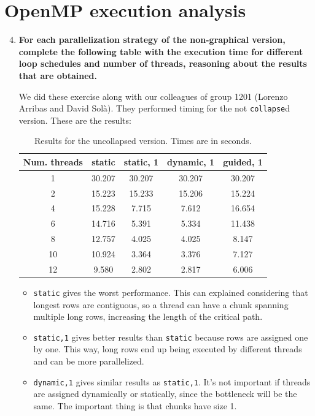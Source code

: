 \documentclass[a4paper,11pt]{article}
\newcommand{\answerspace}{\vspace{0.5cm}}
\begin{document}
\section{OpenMP execution analysis}
\begin{enumerate}
\setcounter{enumi}{3}
\item
\textbf{For each parallelization strategy of the non-graphical version, complete the following table with
    the execution time for different loop schedules and number of threads, reasoning about the results
    that are obtained.}

\answerspace
We did these exercise along with our colleagues of group 1201 (Lorenzo
Arribas and David Solà). They performed timing for the not \texttt{collapse}d version.
These are the results:

\begin{table}[h]
\begin{tabular}{| c || c | c | c | c |}
\hline
\textbf{Num. threads} & \textbf{static} & \textbf{static, 1} & \textbf{dynamic, 1} & \textbf{guided, 1}
\\
\hline
\hline
1 & 30.207 & 30.207 & 30.207 & 30.207
\\
\hline
2 & 15.223 & 15.233 & 15.206 & 15.224
\\
\hline
4 & 15.228 & 7.715 & 7.612 & 16.654
\\
\hline
6 & 14.716 & 5.391 & 5.334 & 11.438
\\
\hline
8 & 12.757 & 4.025 & 4.025 & 8.147
\\
\hline
10 & 10.924 & 3.364 & 3.376 & 7.127
\\
\hline
12 & 9.580 & 2.802 & 2.817 & 6.006
\\
\hline
\end{tabular}
\caption{Results for the uncollapsed version. Times are in seconds.}
\end{table}

\begin{itemize}
\item \texttt{static} gives the worst performance. This can explained considering that
longest rows are contiguous, so a thread can have a chunk spanning multiple long
rows, increasing the length of the critical path.

\item \texttt{static,1} gives better results than \texttt{static} because rows are
  assigned one by one. This way, long rows end up being executed by different threads
  and can be more parallelized.

\item \texttt{dynamic,1} gives similar results as \texttt{static,1}. It's not important
  if threads are assigned dynamically or statically, since the bottleneck will be the same.
  The important thing is that chunks have size 1.


\end{itemize}
\end{enumerate}
\end{document}
